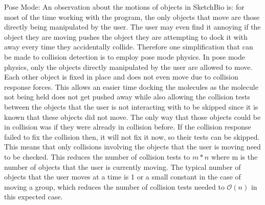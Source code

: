 \documentclass{article} %
\begin{document}
Pose Mode:
An observation about the motions of objects in SketchBio is: for most of the time working with the program, the only objects that move are those directly being manipulated by the user.  The user may even find it annoying if the object they are moving pushes the object they are attempting to dock it with away every time they accidentally collide.  Therefore one simplification that can be made to collision detection is to employ pose mode physics.  In pose mode physics, only the objects directly manipulated by the user are allowed to move.  Each other object is fixed in place and does not even move due to collision response forces.  This allows an easier time docking the molecules as the molecule not being held does not get pushed away while also allowing the collision tests between the objects that the user is not interacting with to be skipped since it is known that these objects did not move.  The only way that those objects could be in collision was if they were already in collision before.  If the collision response failed to fix the collision then, it will not fix it now, so their tests can be skipped.  This means that only collisions involving the objects that the user is moving need to be checked.  This reduces the number of collision tests to $m*n$ where m is the number of objects that the user is currently moving.  The typical number of objects that the user moves at a time is 1 or a small constant in the case of moving a group, which reduces the number of collision tests needed to $\mathcal{O}(n)$ in this expected case.
\end{document}
